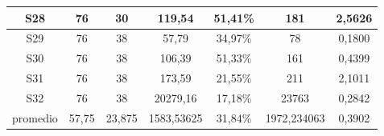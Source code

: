\documentclass[11pt]{article}
\begin{document}
\begin{table}[H]
\begin{tabular}{|c|c|c|c|c|c|c|}
S28                 & 76         & 30         & 119,54                & 51,41\%      & 181               & 2,5626          \\ \hline
S29                 & 76         & 38         & 57,79                 & 34,97\%      & 78                & 0,1800          \\ \hline
S30                 & 76         & 38         & 106,39                & 51,33\%      & 161               & 0,4399          \\ \hline
S31                 & 76         & 38         & 173,59                & 21,55\%      & 211               & 2,1011          \\ \hline
S32                 & 76         & 38         & 20279,16              & 17,18\%  & 23763             & 0,2842          \\ \hline
promedio            & 57,75      & 23,875     & 1583,53625            & 31,84\%      & 1972,234063       & 0,3902          \\ \hline
\end{tabular}
\end{table}
\end{document}
